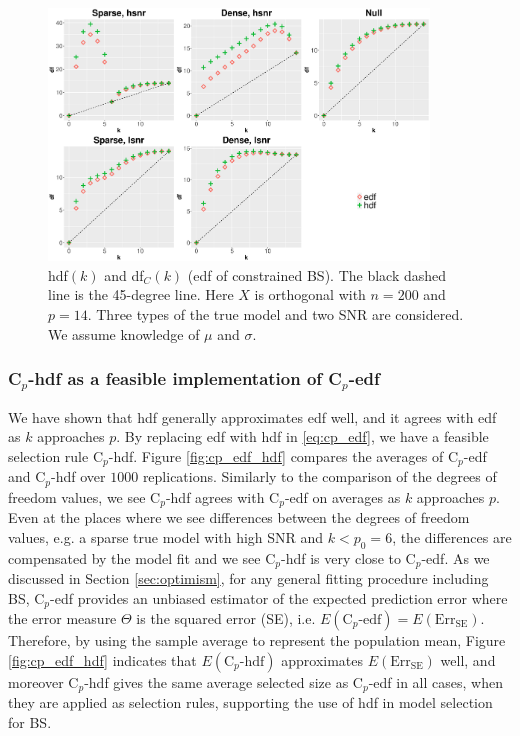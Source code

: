 \begin{figure}[!ht]
	\centering
	\includegraphics[width=0.9\textwidth]{figures/hdf_edf_bs.eps}
	\caption{hdf$(k)$ and df$_C(k)$ (edf of constrained BS). The black dashed line is the 45-degree line. Here $X$ is orthogonal with $n=200$ and $p=14$. Three types of the true model and two SNR are considered. We assume knowledge of $\mu$ and $\sigma$.}
	\label{fig:dfc_dflambda}
\end{figure}



\subsubsection{\texorpdfstring{C$_p$}{Lg}-hdf as a feasible implementation of \texorpdfstring{C$_p$}{Lg}-edf }
\label{sec:cp_edf_hdf}
We have shown that hdf generally approximates edf well, and it agrees with edf as $k$ approaches $p$. By replacing edf with hdf in \eqref{eq:cp_edf}, we have a feasible selection rule C$_p$-hdf. Figure \ref{fig:cp_edf_hdf} compares the averages of C$_p$-edf and C$_p$-hdf over $1000$ replications. Similarly to the comparison of the degrees of freedom values, we see C$_p$-hdf agrees with C$_p$-edf on averages as $k$ approaches $p$. Even at the places where we see differences between the degrees of freedom values, e.g. a sparse true model with high SNR and $k<p_0=6$, the differences are compensated by the model fit and we see C$_p$-hdf is very close to C$_p$-edf. As we discussed in Section \ref{sec:optimism}, for any general fitting procedure including BS, C$_p$-edf provides an unbiased estimator of the expected prediction error where the error measure $\Theta$ is the squared error (SE), i.e. $E(\text{C}_p\text{-edf}) = E(\text{Err}_{\text{SE}})$. Therefore, by using the sample average to represent the population mean, Figure \ref{fig:cp_edf_hdf} indicates that $E(\text{C}_p\text{-hdf})$ approximates $E(\text{Err}_{\text{SE}})$ well, and moreover C$_p$-hdf gives the same average selected size as C$_p$-edf in all cases, when they are applied as selection rules, supporting the use of hdf in model selection for BS.

